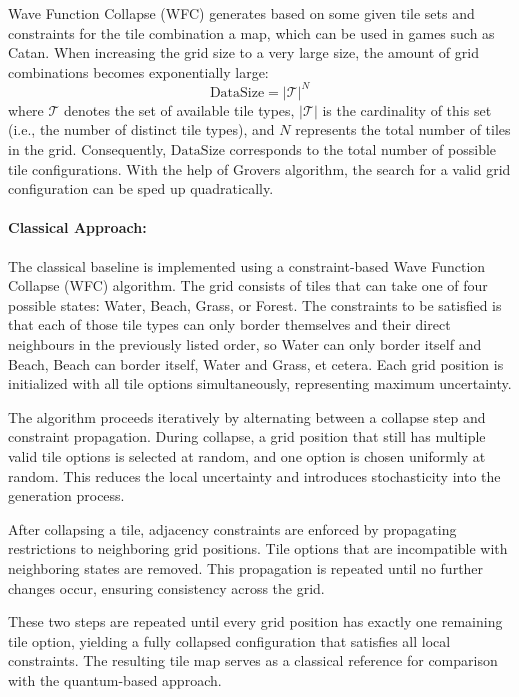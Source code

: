 Wave Function Collapse (WFC) generates based on some given tile sets and constraints for the tile combination a map, which can be used in games such as Catan. When increasing the grid size to a very large size, the amount of grid combinations becomes exponentially large: \[
\text{DataSize} = |\mathcal{T}|^{N}
\]
where $\mathcal{T}$ denotes the set of available tile types, $|\mathcal{T}|$ is the cardinality of this set (i.e., the number of distinct tile types), and $N$ represents the total number of tiles in the grid. Consequently, $\text{DataSize}$ corresponds to the total number of possible tile configurations. With the help of Grovers algorithm, the search for a valid grid configuration can be sped up quadratically. 

\paragraph{Classical Approach:}

The classical baseline is implemented using a constraint-based Wave Function Collapse (WFC) algorithm. The grid consists of tiles that can take one of four possible states: Water, Beach, Grass, or Forest. The constraints to be satisfied is that each of those tile types can only border themselves and their direct neighbours in the previously listed order, so Water can only border itself and Beach, Beach can border itself, Water and Grass, et cetera. Each grid position is initialized with all tile options simultaneously, representing maximum uncertainty.

\vspace{1em}
\noindent
The algorithm proceeds iteratively by alternating between a collapse step and constraint propagation. During collapse, a grid position that still has multiple valid tile options is selected at random, and one option is chosen uniformly at random. This reduces the local uncertainty and introduces stochasticity into the generation process.

\vspace{1em}
\noindent
After collapsing a tile, adjacency constraints are enforced by propagating restrictions to neighboring grid positions. Tile options that are incompatible with neighboring states are removed. This propagation is repeated until no further changes occur, ensuring consistency across the grid.

\vspace{1em}
\noindent
These two steps are repeated until every grid position has exactly one remaining tile option, yielding a fully collapsed configuration that satisfies all local constraints. The resulting tile map serves as a classical reference for comparison with the quantum-based approach.


